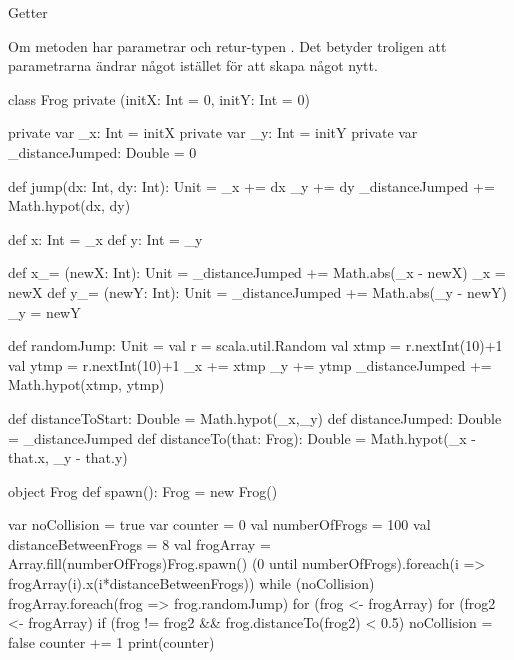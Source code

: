 \Subtask Getter

\Subtask Om metoden har parametrar och retur-typen . Det betyder troligen att parametrarna ändrar något istället för att skapa något nytt.

\Subtask \begin{CodeSmall}
class Frog private (initX: Int = 0, initY: Int = 0) {
	private var _x: Int = initX
	private var _y: Int = initY
	private var _distanceJumped: Double = 0
	
	def jump(dx: Int, dy: Int): Unit = {
		_x += dx
		_y += dy
		_distanceJumped += Math.hypot(dx, dy)
	}
	
	def x: Int = _x
	def y: Int = _y
	
	def x_= (newX: Int): Unit = {
		_distanceJumped += Math.abs(_x - newX)
		_x = newX
	} 
	def y_= (newY: Int): Unit = {
		_distanceJumped += Math.abs(_y - newY)
		_y = newY
	} 
	
	def randomJump: Unit = {
		val r = scala.util.Random
		val xtmp = r.nextInt(10)+1
		val ytmp = r.nextInt(10)+1
		_x += xtmp
		_y += ytmp
		_distanceJumped += Math.hypot(xtmp, ytmp)
	}
	
	def distanceToStart: Double = Math.hypot(_x,_y)
	def distanceJumped: Double = _distanceJumped
	def distanceTo(that: Frog): Double = Math.hypot(_x - that.x, _y - that.y)
}

object Frog {
	def spawn(): Frog = new Frog()
}
\end{CodeSmall}

\Subtask \begin{CodeSmall}
var noCollision = true
var counter = 0
val numberOfFrogs = 100
val distanceBetweenFrogs = 8
val frogArray = Array.fill(numberOfFrogs){Frog.spawn()}
(0 until numberOfFrogs).foreach(i => frogArray(i).x(i*distanceBetweenFrogs))
while (noCollision) {
	frogArray.foreach(frog => frog.randomJump)
	for (frog <- frogArray) {
		for (frog2 <- frogArray) {
			if (frog != frog2 && frog.distanceTo(frog2) < 0.5) {
				noCollision = false
			}
		}
	}
	counter += 1
} 
print(counter)
\end{CodeSmall}


\clearpage

\ExtraTasks %

\Task 

\vspace{1em} %

